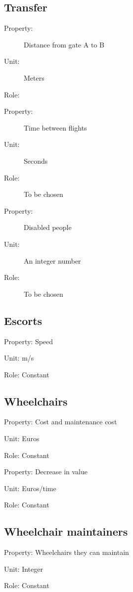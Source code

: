 \documentclass[a4paper, 12pt, notitlepage]{report}
\begin{document}
\subsection{Transfer}
\begin{description}
\item[Property:] Distance from gate A to B
\item[Unit:] Meters
\item[Role:]
\end{description}
\begin{description}
\item[Property:] Time between flights
\item[Unit:] Seconds
\item[Role:] To be chosen
\end{description}
\begin{description}
\item[Property:] Disabled people
\item[Unit:] An integer number
\item[Role:] To be chosen
\end{description}
\subsection{Escorts}
\begin{Description}
\item[Property:] Speed
\item[Unit:] m/s
\item[Role:] Constant
\end{Description}
\subsection{Wheelchairs}
\begin{Description}
\item[Property:] Cost and maintenance cost
\item[Unit:] Euros
\item[Role:] Constant

\item[Property:] Decrease in value
\item[Unit:] Euros/time
\item[Role:] Constant
\end{Description}
\subsection{Wheelchair maintainers}
\begin{Description}
\item[Property:] Wheelchairs they can maintain
\item[Unit:] Integer
\item[Role:] Constant
\end{Description}
\end{document}
